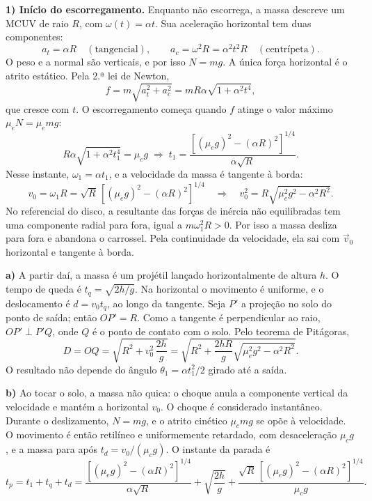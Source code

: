 \documentclass{article}%
\begin{document}
\textbf{1) Início do escorregamento.} Enquanto não escorrega, a massa descreve um MCUV de raio $R$, com $\omega(t)=\alpha t$. Sua aceleração horizontal tem duas componentes:
\[
a_t=\alpha R \quad (\text{tangencial}), \qquad a_c=\omega^2R=\alpha^2t^2R \quad (\text{centrípeta}).
\]
O peso e a normal são verticais, e por isso $N=mg$. A única força horizontal é o atrito estático. Pela 2.ª lei de Newton,
\[
f=m\sqrt{a_t^2+a_c^2}=mR\alpha\sqrt{1+\alpha^2t^4},
\]
que cresce com $t$. O escorregamento começa quando $f$ atinge o valor máximo $\mu_e N=\mu_e mg$:
\[
R\alpha\sqrt{1+\alpha^2t_1^4}=\mu_e g \;\Longrightarrow\; t_1=\frac{\left[(\mu_e g)^2-(\alpha R)^2\right]^{1/4}}{\alpha\sqrt{R}} .
\]
Nesse instante, $\omega_1=\alpha t_1$, e a velocidade da massa é tangente à borda:
\[
v_0=\omega_1R=\sqrt{R}\,\left[(\mu_e g)^2-(\alpha R)^2\right]^{1/4}
\quad\Longrightarrow\quad v_0^2=R\sqrt{\mu_e^2g^2-\alpha^2R^2}.
\]
No referencial do disco, a resultante das forças de inércia não equilibradas tem uma componente radial para fora, igual a $m\omega_1^2R>0$. Por isso a massa desliza para fora e abandona o carrossel. Pela continuidade da velocidade, ela sai com $\vec v_0$ horizontal e tangente à borda.

\textbf{a)} A partir daí, a massa é um projétil lançado horizontalmente de altura $h$. O tempo de queda é $t_q=\sqrt{2h/g}$. Na horizontal o movimento é uniforme, e o deslocamento é $d=v_0t_q$, ao longo da tangente. Seja $P'$ a projeção no solo do ponto de saída; então $OP'=R$. Como a tangente é perpendicular ao raio, $OP'\perp P'Q$, onde $Q$ é o ponto de contato com o solo. Pelo teorema de Pitágoras,
\[
D=OQ=\sqrt{R^2+v_0^2\,\frac{2h}{g}}=\sqrt{R^2+\frac{2hR}{g}\sqrt{\mu_e^2g^2-\alpha^2R^2}} .
\]
O resultado não depende do ângulo $\theta_1=\alpha t_1^2/2$ girado até a saída.

\textbf{b)} Ao tocar o solo, a massa não quica: o choque anula a componente vertical da velocidade e mantém a horizontal $v_0$. O choque é considerado instantâneo. Durante o deslizamento, $N=mg$, e o atrito cinético $\mu_c mg$ se opõe à velocidade. O movimento é então retilíneo e uniformemente retardado, com desaceleração $\mu_c g$, e a massa para após $t_d=v_0/(\mu_c g)$. O instante da parada é
\[
t_p=t_1+t_q+t_d=\frac{\left[(\mu_e g)^2-(\alpha R)^2\right]^{1/4}}{\alpha\sqrt{R}}+\sqrt{\frac{2h}{g}}+\frac{\sqrt{R}\,\left[(\mu_e g)^2-(\alpha R)^2\right]^{1/4}}{\mu_c g}.
\]
\end{document}
